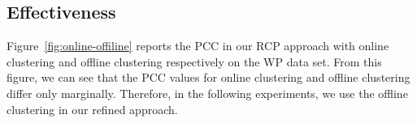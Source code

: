 
\subsection{Effectiveness}
Figure~\ref{fig:online-offiline} reports the PCC in our RCP
approach with online clustering and offline
clustering respectively on the WP data set.
From this figure, we can see that the PCC values for
online clustering and offline clustering differ only marginally.
Therefore, in the following experiments,
we use the offline clustering in our refined approach.


